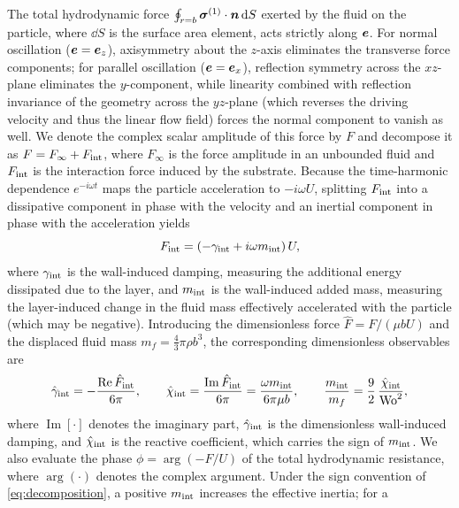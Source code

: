 The total hydrodynamic force $\oint_{r=b}\bm{\sigma}^{(1)}\cdot\bm{n}\,\mathrm{d} S$ exerted by the fluid on the particle, where $\dd S$
is the surface area element, acts strictly along $\bm{e}$. For normal oscillation ($\bm{e}=\bm{e}_z$), axisymmetry about the
$z$-axis eliminates the transverse force components; for parallel oscillation ($\bm{e}=\bm{e}_x$), reflection symmetry across
the $xz$-plane eliminates the $y$-component, while linearity combined with reflection invariance of the geometry across
the $yz$-plane (which reverses the driving velocity and thus the linear flow field) forces the normal component to vanish
as well. We denote the complex scalar amplitude of this force by $F$ and decompose it as $F=F_\infty+F_{\rm int}$, where
$F_\infty$ is the force amplitude in an unbounded fluid and $F_{\rm int}$ is the interaction force induced by the
substrate. Because the time-harmonic dependence $e^{-i\omega t}$ maps the particle acceleration to $-i\omega U$,
splitting $F_{\rm int}$ into a dissipative component in phase with the velocity and an inertial component in phase with
the acceleration yields
\begin{equation}
  F_{\rm int}=\left(-\gamma_{\rm int}+i\omega m_{\rm int}\right)U,
  \label{eq:decomposition}
\end{equation}
where $\gamma_{\rm int}$ is the wall-induced damping, measuring the additional energy dissipated due to the layer, and
$m_{\rm int}$ is the wall-induced added mass, measuring the layer-induced change in the fluid mass effectively
accelerated with the particle (which may be negative). Introducing the dimensionless force $\hat F=F/(\mu bU)$ and the
displaced fluid mass $m_f=\tfrac43\pi\rho b^3$, the corresponding dimensionless observables are
\begin{equation}
  \hat\gamma_{\rm int}=-\frac{\operatorname{Re}\hat F_{\rm int}}{6\pi},\qquad
  \hat\chi_{\rm int}=\frac{\operatorname{Im}\hat F_{\rm int}}{6\pi}=\frac{\omega m_{\rm int}}{6\pi\mu b},\qquad
  \frac{m_{\rm int}}{m_f}=\frac{9}{2}\,\frac{\hat\chi_{\rm int}}{\mathrm{Wo}^2},
  \label{eq:observables}
\end{equation}
where $\operatorname{Im}[\cdot]$ denotes the imaginary part, $\hat\gamma_{\rm int}$ is the dimensionless wall-induced
damping, and $\hat\chi_{\rm int}$ is the reactive coefficient, which carries the sign of $m_{\rm int}$. We also evaluate
the phase $\phi=\arg(-F/U)$ of the total hydrodynamic resistance, where $\arg(\cdot)$ denotes the complex argument.
Under the sign convention of \cref{eq:decomposition}, a positive $m_{\rm int}$ increases the effective inertia; for a
